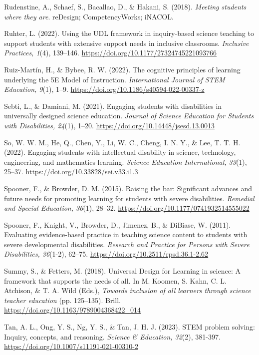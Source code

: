 \documentclass[11.5pt]{sig-alternate} %
\begin{document}
Rudenstine, A., Schaef, S., Bacallao, D., \& Hakani, S. (2018). \textit{Meeting students where they are}. reDesign; CompetencyWorks; iNACOL.

Ruhter, L. (2022). Using the UDL framework in inquiry-based science teaching to support students with extensive support needs in inclusive classrooms. \textit{Inclusive Practices, 1}(4), 139–146. \url{https://doi.org/10.1177/27324745221093766}

Ruiz-Martín, H., \& Bybee, R. W. (2022). The cognitive principles of learning underlying the 5E Model of Instruction. \textit{International Journal of STEM Education, 9}(1), 1–9. \url{https://doi.org/10.1186/s40594-022-00337-z}

Sebti, L., \& Damiani, M. (2021). Engaging students with disabilities in universally designed science education. \textit{Journal of Science Education for Students with Disabilities, 24}(1), 1–20. \url{https://doi.org/10.14448/jsesd.13.0013}

So, W. W. M., He, Q., Chen, Y., Li, W. C., Cheng, I. N. Y., \& Lee, T. T. H. (2022). Engaging students with intellectual disability in science, technology, engineering, and mathematics learning. \textit{Science Education International, 33}(1), 25–37. \url{https://doi.org/10.33828/sei.v33.i1.3}

Spooner, F., \& Browder, D. M. (2015). Raising the bar: Significant advances and future needs for promoting learning for students with severe disabilities. \textit{Remedial and Special Education, 36}(1), 28–32. \url{https://doi.org/10.1177/0741932514555022}

Spooner, F., Knight, V., Browder, D., Jimenez, B., \& DiBiase, W. (2011). Evaluating evidence-based practice in teaching science content to students with severe developmental disabilities. \textit{Research and Practice for Persons with Severe Disabilities, 36}(1-2), 62–75. \url{https://doi.org/10.2511/rpsd.36.1-2.62}

Summy, S., \& Fetters, M. (2018). Universal Design for Learning in science: A framework that supports the needs of all. In M. Koomen, S. Kahn, C. L. Atchison, \& T. A. Wild (Eds.), \textit{Towards inclusion of all learners through science teacher education} (pp. 125–135). Brill. \url{https://doi.org/10.1163/9789004368422_014}

Tan, A. L., Ong, Y. S., Ng, Y. S., \& Tan, J. H. J. (2023). STEM problem solving: Inquiry, concepts, and reasoning. \textit{Science \& Education, 32}(2), 381-397. \url{https://doi.org/10.1007/s11191-021-00310-2}
\end{document}
